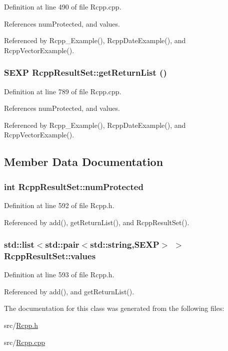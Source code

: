 Definition at line 490 of file Rcpp.cpp.

References numProtected, and values.

Referenced by Rcpp\_\-Example(), RcppDateExample(), and RcppVectorExample().\hypertarget{classRcppResultSet_a916989ff6c0ed1149a5f93fb6a532946}{
\subsubsection[{getReturnList}]{\setlength{\rightskip}{0pt plus 5cm}SEXP RcppResultSet::getReturnList ()}}
\label{classRcppResultSet_a916989ff6c0ed1149a5f93fb6a532946}


Definition at line 789 of file Rcpp.cpp.

References numProtected, and values.

Referenced by Rcpp\_\-Example(), RcppDateExample(), and RcppVectorExample().

\subsection{Member Data Documentation}
\hypertarget{classRcppResultSet_a19edd02ac05783f9b4fd840c22e74153}{
\subsubsection[{numProtected}]{\setlength{\rightskip}{0pt plus 5cm}int {\bf RcppResultSet::numProtected}}}
\label{classRcppResultSet_a19edd02ac05783f9b4fd840c22e74153}


Definition at line 592 of file Rcpp.h.

Referenced by add(), getReturnList(), and RcppResultSet().\hypertarget{classRcppResultSet_a509f3d779c88476dea89ade9c08d403f}{
\subsubsection[{values}]{\setlength{\rightskip}{0pt plus 5cm}std::list$<$std::pair$<$std::string,SEXP$>$ $>$ {\bf RcppResultSet::values}}}
\label{classRcppResultSet_a509f3d779c88476dea89ade9c08d403f}


Definition at line 593 of file Rcpp.h.

Referenced by add(), and getReturnList().

The documentation for this class was generated from the following files:\begin{DoxyCompactItemize}
\item 
src/\hyperlink{Rcpp_8h}{Rcpp.h}\item 
src/\hyperlink{Rcpp_8cpp}{Rcpp.cpp}\end{DoxyCompactItemize}
